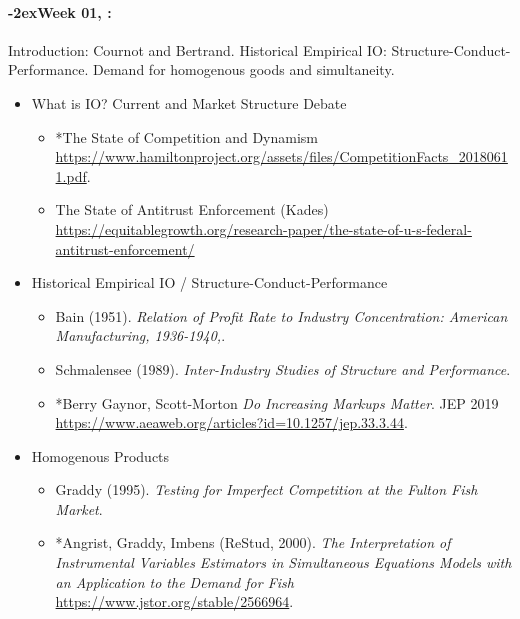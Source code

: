 \documentclass[11pt]{article}
\newcommand{\week}[1]{%
  \paragraph*{\kern-2ex\quad #1, \syldate{\today}:}%
  \ifdim\wd1=\wd\THURSDAY
    \AdvanceDate[7]
  \else
    \AdvanceDate[7]
  \fi%
}
\begin{document}
\SetDate[01/09/2023]
\week{Week 01} Introduction: Cournot and Bertrand. Historical Empirical IO: Structure-Conduct-Performance. Demand for homogenous goods and simultaneity.
\begin{itemize}
\item What is IO? Current and Market Structure Debate
\begin{itemize}
\item *The State of Competition and Dynamism \url{https://www.hamiltonproject.org/assets/files/CompetitionFacts_20180611.pdf}.
\item The State of Antitrust Enforcement (Kades) \url{https://equitablegrowth.org/research-paper/the-state-of-u-s-federal-antitrust-enforcement/}
\end{itemize}

\item Historical Empirical IO / Structure-Conduct-Performance
\begin{itemize}
\item Bain (1951). \textit{Relation of Profit Rate to Industry Concentration: American Manufacturing, 1936-1940,}.
\item Schmalensee (1989). \textit{Inter-Industry Studies of Structure and Performance}.
\item *Berry Gaynor, Scott-Morton \textit{Do Increasing Markups Matter}. JEP 2019 \url{https://www.aeaweb.org/articles?id=10.1257/jep.33.3.44}.
\end{itemize}
\item Homogenous Products
\begin{itemize}
\item Graddy (1995). \textit{Testing for Imperfect Competition at the Fulton Fish Market}.
\item *Angrist, Graddy, Imbens (ReStud, 2000). \textit{The Interpretation of Instrumental Variables Estimators in Simultaneous Equations Models with an Application to the Demand for Fish} \url{https://www.jstor.org/stable/2566964}.
\end{itemize}
\end{itemize}
\end{document}
